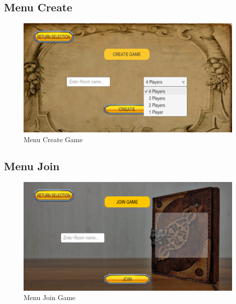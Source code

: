 \documentclass[a4paper]{article}
\begin{document}
	\subsection{Menu Create}
	\begin{figure}[!ht]
		\centering
		\includegraphics[scale=0.3]{images/create.png}
		\caption{Menu Create Game}
	\end{figure}
	
	\subsection{Menu Join}
	\begin{figure}[!ht]
		\centering
		\includegraphics[scale=0.3]{images/join.png}
		\caption{Menu Join Game}
	\end{figure}

	\clearpage
	
\end{document}
